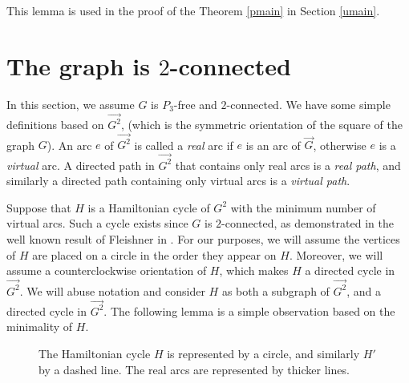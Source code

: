 \documentclass[12pt,letterpaper,oneside]{book}
\begin{document}
This lemma is used in the proof of the Theorem \ref{pmain} in Section \ref{umain}.  


\newpage
\section{The graph is $2$-connected}
\label{sec:twocon}

In this section, we assume $G$ is $P_3$-free and $2$-connected.  
We have some simple definitions based on $\vec{G^2}$, (which is the symmetric orientation of the square of the graph $G$).  
An arc $e$ of $\vec{G^2}$ is called a \emph{real} arc if $e$ is 
an arc of $\vec{G}$, otherwise $e$ is a \emph{virtual} arc.  
A directed path in $\vec{G^2}$ that contains only real arcs is a \emph{real path},  
and similarly a directed path containing only virtual arcs is a \emph{virtual path}. 
 

Suppose that $H$ is a Hamiltonian cycle of $G^2$ with the minimum number of virtual arcs.  Such a cycle exists 
since $G$ is $2$-connected, as demonstrated in the well known result of Fleishner in \cite{FL}.  
For our  
purposes, we will assume the vertices of $H$ are placed on a circle in the order they appear on $H$.  Moreover, we will assume  
a counterclockwise orientation of $H$, which makes $H$ a directed cycle in $\vec{G^2}$.  
We will abuse notation and consider $H$ as both a subgraph of $\vec{G^2}$, and a directed cycle in $\vec{G^2}$.  
The following lemma is a simple observation based on the minimality of $H$.  

\begin{figure} 
\centering 
{} 
\caption[A forbidden configuration based on minimality]
{The Hamiltonian cycle $H$ is represented by a circle, and similarly $H'$ by a dashed line.  
The real arcs are represented by thicker lines.  \label{fig:forbid}} 
\end{figure} 
  
\end{document}
